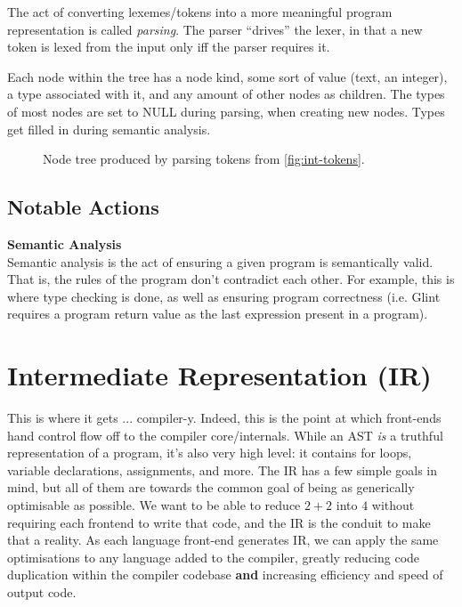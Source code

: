 \documentclass[12pt]{article}
\begin{document}
The act of converting lexemes/tokens into a more meaningful program representation is called \emph{parsing}. The parser ``drives'' the lexer, in that a new token is lexed from the input only iff the parser requires it.

Each node within the tree has a node kind, some sort of value (text, an integer), a type associated with it, and any amount of other nodes as children. The types of most nodes are set to NULL during parsing, when creating new nodes. Types get filled in during semantic analysis.

\begin{figure}[h]
  \centering
  \caption{Node tree produced by parsing tokens from \autoref{fig:int-tokens}.}
  \label{fig:int-tree}
\end{figure}
\FloatBarrier

\subsection{Notable Actions}
\label{subsec:node-tree:notable-actions}

\noindent\textbf{Semantic Analysis}\\
Semantic analysis is the act of ensuring a given program is semantically valid. That is, the rules of the program don't contradict each other. For example, this is where type checking is done, as well as ensuring program correctness (i.e. Glint requires a program return value as the last expression present in a program).

\section{Intermediate Representation (IR)}
\label{sec:ir}

This is where it gets ... compiler-y. Indeed, this is the point at which front-ends hand control flow off to the compiler core/internals. While an AST \emph{is} a truthful representation of a program, it's also very high level: it contains for loops, variable declarations, assignments, and more. The IR has a few simple goals in mind, but all of them are towards the common goal of being as generically optimisable as possible. We want to be able to reduce $2 + 2$ into $4$ without requiring each frontend to write that code, and the IR is the conduit to make that a reality. As each language front-end generates IR, we can apply the same optimisations to any language added to the compiler, greatly reducing code duplication within the compiler codebase \textbf{and} increasing efficiency and speed of output code.
\end{document}
